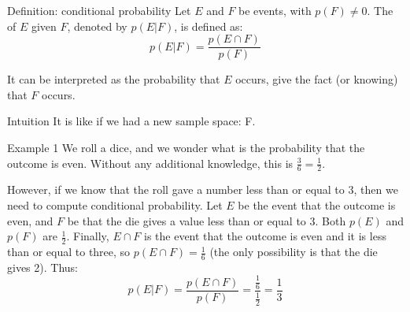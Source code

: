 \documentclass[a4paper]{article}
\begin{document}
\begin{parag}{Definition: conditional probability}
    Let $E$ and $F$ be events, with $p\left(F\right) \neq 0$. The  of $E$ given $F$, denoted by $p\left(E | F\right)$, is defined as: 
    \[p\left(E|F\right) = \frac{p\left(E \cap F\right)}{p\left(F\right)}\]
    
    It can be interpreted as the probability that $E$ occurs, give the fact (or knowing) that $F$ occurs.

    \begin{subparag}{Intuition}
        It is like if we had a new sample space: F.

    \end{subparag}
\end{parag}

\begin{parag}{Example 1}
    We roll a dice, and we wonder what is the probability that the outcome is even. Without any additional knowledge, this is $\frac{3}{6} = \frac{1}{2}$.

    However, if we know that the roll gave a number less than or equal to 3, then we need to compute conditional probability. Let $E$ be the event that the outcome is even, and $F$ be that the die gives a value less than or equal to $3$. Both $p\left(E\right)$ and $p\left(F\right)$ are $\frac{1}{2}$. Finally, $E \cap F$ is the event that the outcome is even and it is less than or equal to three, so $p\left(E \cap F\right) = \frac{1}{6}$ (the only possibility is that the die gives 2). Thus: 
    \[p\left(E | F\right) = \frac{p\left(E \cap F\right)}{p\left(F\right)} = \frac{\frac{1}{6}}{\frac{1}{2}} = \frac{1}{3}\]
\end{parag}
\end{document}
